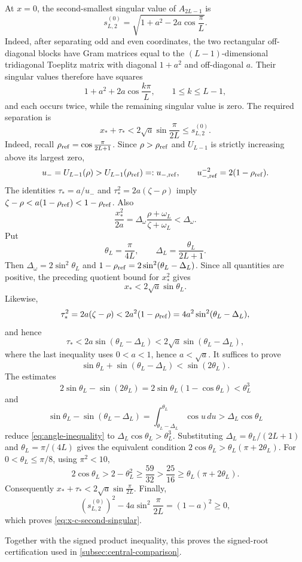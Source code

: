 \documentclass[11pt,a4paper]{article}
\numberwithin{equation}{section}
\begin{document}
At \(x=0\), the second-smallest singular value of \(A_{2L-1}\) is
\[
 s_{L,2}^{(0)}=\sqrt{1+a^2-2a\cos\frac{\pi}{L}}.
\]
Indeed, after separating odd and even coordinates, the two rectangular
off-diagonal blocks have Gram matrices equal to the
\((L-1)\)-dimensional tridiagonal Toeplitz matrix with diagonal
\(1+a^2\) and off-diagonal \(a\).  Their singular values therefore have
squares
\[
 1+a^2+2a\cos\frac{k\pi}{L},\qquad 1\leq k\leq L-1,
\]
and each occurs twice, while the remaining singular value is zero.
The required separation is
\[
 x_*+\tau_*<2\sqrt a\sin\frac{\pi}{2L}\leq s_{L,2}^{(0)}.
\]
Indeed, recall \(\rho_{\rm ref}=\cos\frac{\pi}{2L+1}\).  Since
\(\rho>\rho_{\rm ref}\) and \(U_{L-1}\) is strictly increasing above its
largest zero,
\[
 u_-=U_{L-1}(\rho)>U_{L-1}(\rho_{\rm ref})=:u_{-,\rm ref},
 \qquad u_{-,\rm ref}^{-2}=2(1-\rho_{\rm ref}).
\]
The identities \(\tau_*=a/u_-\) and \(\tau_*^2=2a(\zeta-\rho)\) imply
\(\zeta-\rho<a(1-\rho_{\rm ref})<1-\rho_{\rm ref}\).  Also
\[
 \frac{x_*^2}{2a}
 =\Delta_\omega\frac{\rho+\omega_L}{\zeta+\omega_L}
 <\Delta_\omega.
\]
Put
\[
 \theta_L=\frac{\pi}{4L},\qquad
 \Delta_L=\frac{\theta_L}{2L+1}.
\]
Then \(\Delta_\omega=2\sin^2\theta_L\) and
\(1-\rho_{\rm ref}=2\sin^2(\theta_L-\Delta_L)\).  Since all quantities are
positive, the preceding quotient bound for \(x_*^2\) gives
\[
 x_*<2\sqrt a\sin\theta_L.
\]
Likewise,
\[
 \tau_*^2=2a(\zeta-\rho)
 <2a^2(1-\rho_{\rm ref})
 =4a^2\sin^2(\theta_L-\Delta_L),
\]
and hence
\[
 \tau_*<2a\sin(\theta_L-\Delta_L)
 <2\sqrt a\sin(\theta_L-\Delta_L),
\]
where the last inequality uses \(0<a<1\), hence \(a<\sqrt a\).
It suffices to prove
\begin{equation}\label{eq:angle-inequality}
 \sin\theta_L+\sin(\theta_L-\Delta_L)<\sin(2\theta_L).
\end{equation}
The estimates
\[
 2\sin\theta_L-\sin(2\theta_L)
 =2\sin\theta_L(1-\cos\theta_L)<\theta_L^3
\]
and
\[
 \sin\theta_L-\sin(\theta_L-\Delta_L)
 =\int_{\theta_L-\Delta_L}^{\theta_L}\cos u\,du
 >\Delta_L\cos\theta_L
\]
reduce \eqref{eq:angle-inequality} to
\(\Delta_L\cos\theta_L>\theta_L^3\).  Substituting
\(\Delta_L=\theta_L/(2L+1)\) and \(\theta_L=\pi/(4L)\) gives the equivalent
condition \(2\cos\theta_L>\theta_L(\pi+2\theta_L)\).  For
\(0<\theta_L\leq\pi/8\), using \(\pi^2<10\),
\[
 2\cos\theta_L>2-\theta_L^2\geq\frac{59}{32}
 >\frac{25}{16}\geq\theta_L(\pi+2\theta_L).
\]
Consequently \(x_*+\tau_*<2\sqrt a\sin\frac{\pi}{2L}\).  Finally,
\[
 (s_{L,2}^{(0)})^2-4a\sin^2\frac{\pi}{2L}
 =(1-a)^2\geq0,
\]
which proves \eqref{eq:x-c-second-singular}.

Together with the signed product inequality, this proves the signed-root
certification used in \cref{subsec:central-comparison}.





\end{document}
